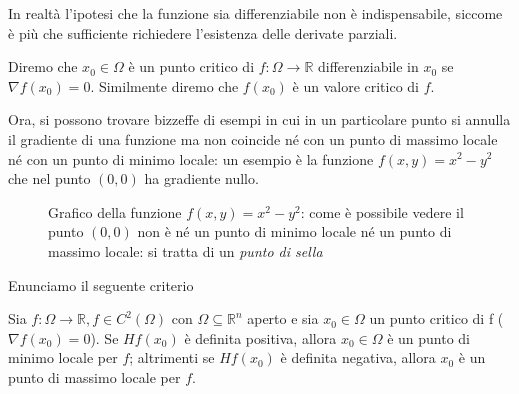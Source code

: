 \documentclass[openany, italian]{book}
\begin{document}
\begin{remark}
In realtà l'ipotesi che la funzione sia differenziabile non è indispensabile, siccome è più che sufficiente richiedere l'esistenza delle derivate parziali.
\end{remark}
\begin{definition}
Diremo che $x_0 \in \Omega$ è un punto critico di $f: \Omega \to \mathbb{R}$ differenziabile in $x_0$ se $\nabla{f(x_0)} = 0$. Similmente diremo che $f(x_0)$ è un valore critico di $f$.
\end{definition}
Ora, si possono trovare bizzeffe di esempi in cui in un particolare punto si annulla il gradiente di una funzione ma non coincide né con un punto di massimo locale né con un punto di minimo locale: un esempio è la funzione $f(x, y) = x^2 - y^2$ che nel punto $(0, 0)$ ha gradiente nullo. \\
\begin{figure}[htbp]
\centering
{}
\label{fig:punto_sella}
\caption{Grafico della funzione $f(x, y) = x^2 - y^2$: come è possibile vedere il punto $(0, 0)$ non è né un punto di minimo locale né un punto di massimo locale: si tratta di un \emph{punto di sella}}
\end{figure}
Enunciamo il seguente criterio
\begin{theorem}
Sia $f:\Omega \to \mathbb{R}, f \in C^2 (\Omega)$ con $\Omega \subseteq \mathbb{R}^n$ aperto e sia $x_0 \in \Omega$ un punto critico di f ($\nabla f(x_0) = 0$). Se $Hf(x_0)$ è definita positiva, allora $x_0 \in \Omega$ è un punto di minimo locale per $f$; altrimenti se $Hf(x_0)$ è definita negativa, allora $x_0$ è un punto di massimo locale per $f$.
\end{theorem}
\end{document}
